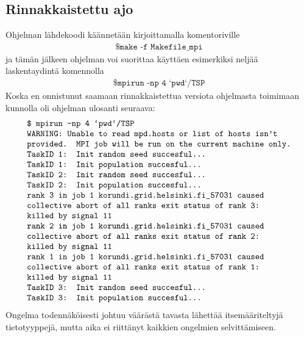 \documentclass[12pt]{article}
\numberwithin{equation}{section}
\numberwithin{table}{section}
\begin{document}
\subsection{Rinnakkaistettu ajo}
Ohjelman lähdekoodi käännetään kirjoittamalla komentoriville  
\begin{align*}
\texttt{\$ make -f Makefile\_mpi}
\end{align*}
ja tämän jälkeen ohjelman voi suorittaa käyttäen esimerkiksi neljää laskentaydintä komennolla
\begin{align*}
\texttt{\$ mpirun -np 4 `pwd`/TSP}
\end{align*}
Koska en onnistunut saamaan rinnakkaistettua versiota ohjelmasta toimimaan kunnolla oli ohjelman ulosanti seuraava:
\begin{align*}
\begin{tabular}{l}
\texttt{\$ mpirun -np 4 `pwd`/TSP }\\
\texttt{WARNING: Unable to read mpd.hosts or list of hosts isn't }\\\texttt{provided. MPI job will be run on the current machine only.}\\
\texttt{TaskID 1: Init random seed succesful...}\\
\texttt{TaskID 1: Init population succesful... }\\
\texttt{TaskID 2: Init random seed succesful... }\\
\texttt{TaskID 2: Init population succesful... }\\
\texttt{rank 3 in job 1  korundi.grid.helsinki.fi\_57031   caused }\\\texttt{collective abort of all ranks
  exit status of rank 3: }\\\texttt{killed by signal 11}\\
  \texttt{rank 2 in job 1  korundi.grid.helsinki.fi\_57031   caused }\\\texttt{collective abort of all ranks
  exit status of rank 2: }\\\texttt{killed by signal 11}\\
  \texttt{rank 1 in job 1  korundi.grid.helsinki.fi\_57031   caused }\\\texttt{collective abort of all ranks
  exit status of rank 1: }\\\texttt{killed by signal 11}\\
  \texttt{TaskID 3: Init random seed succesful...}\\
  \texttt{TaskID 3: Init population succesful...}
\end{tabular}
\end{align*}
Ongelma todennäköisesti johtuu väärästä tavasta lähettää itsemääriteltyjä tietotyyppejä, mutta aika ei riittänyt kaikkien ongelmien selvittämiseen. 
\end{document}
